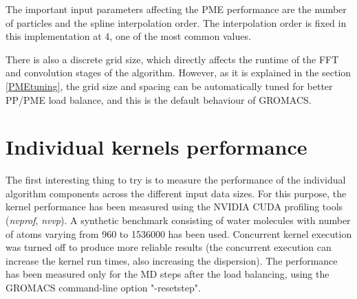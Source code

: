 \documentclass[12pt,a4paper]{report}
\newcommand{\draft}[1]{#1}
\begin{document}
The important input parameters affecting the PME performance are the number of particles and the spline interpolation order.
The interpolation order is fixed in this implementation at 4, one of the most common values.


There is also a discrete grid size, which directly affects the runtime of the FFT and convolution stages of the algorithm. However, as it is explained in the section \ref{PMEtuning}, the grid size and spacing can be automatically tuned for better PP/PME load balance, and this is the default behaviour of GROMACS. 






\section{Individual kernels performance} \label{chapter_kernels}

The first interesting thing to try is to measure the performance of the individual algorithm components across the different input data sizes.
For this purpose, the kernel performance has been measured using the NVIDIA CUDA profiling tools (\textit{nvprof}, \textit{nvvp}). A synthetic benchmark consisting of water molecules with number of atoms varying from 960 to 1536000 has been used. 
Concurrent kernel execution was turned off to produce more reliable results (the concurrent execution can increase the kernel run times, also increasing the  dispersion). The performance has been measured only for the MD steps after the load balancing, using the GROMACS command-line option "-resetstep". 
 
\end{document}
